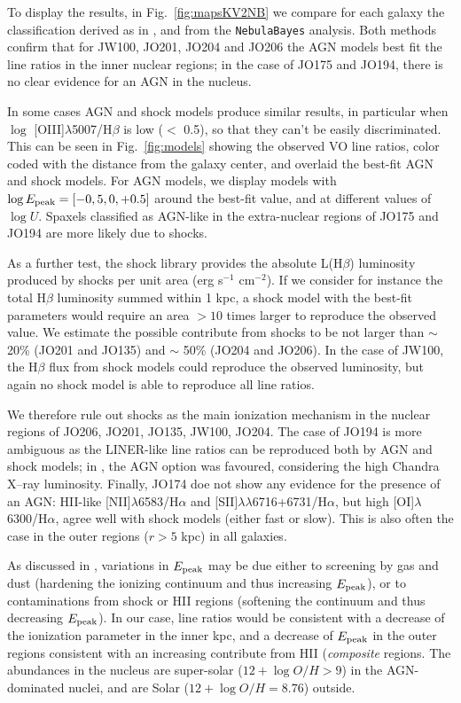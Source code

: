\documentclass[fleqn,usenatbib]{mnras}
\begin{document}
To display the results, in Fig.~\ref{fig:mapsKV2NB} we compare for each galaxy the classification derived as in \citet{2017ApJ...844...48P}, and from the \texttt{NebulaBayes} analysis. Both methods confirm that for JW100, JO201, JO204 and JO206 the AGN models best fit the line ratios in the inner nuclear regions; in the case of JO175 and JO194, there is no clear evidence for an AGN in the nucleus. 

In some cases AGN and shock models produce similar results, in particular when $\log$ [OIII]$\lambda$5007/H$\beta$  is low ($<$ 0.5), so that they can't be easily discriminated. This can be seen in Fig.~\ref{fig:models} showing the observed VO line ratios, color coded with the distance from the galaxy center, and  overlaid the
best-fit AGN and shock models. For AGN models, we display models with $\log E_{\rm peak} =[-0,5,0,+0.5]$ around the best-fit value, and at different values of $\log U$. 
Spaxels classified as AGN-like in the extra-nuclear regions of  JO175 and JO194 are more likely due to shocks. 

As a further test, the \citet{2008ApJS..178...20A} shock library  provides the   absolute L(H$\beta$) luminosity  produced by shocks per unit area (erg s$^{-1}$ cm$^{-2}$). If we consider for instance the total H$\beta$ luminosity summed within 1 kpc, a shock model with the best-fit parameters would require an area  $>10$ times larger to reproduce the observed value. We estimate the possible contribute from shocks to be not larger than $\sim$ 20\% (JO201 and JO135) and $\sim$ 50\% (JO204 and JO206). In the case of JW100, the H$\beta$ flux from shock models could reproduce the observed luminosity, but again no shock model is able to reproduce all line ratios.


We therefore rule out shocks as the main ionization mechanism in the nuclear regions of JO206, JO201, JO135, JW100, JO204. The case of JO194 is more ambiguous as the LINER-like line ratios can be reproduced both by AGN and shock models; in \citet{2017Natur.548..304P}, the AGN option was favoured, considering the high Chandra X--ray luminosity. 
Finally, JO174 doe not show any evidence for the presence of an AGN:  HII-like [NII]$\lambda$6583/H$\alpha$ and [SII]$\lambda\lambda$6716+6731/H$\alpha$, but high [OI]$\lambda$6300/H$\alpha$, agree well with shock models (either fast or slow).  This is also often the case in the outer regions ($r > 5$ kpc) in all galaxies. 


As discussed in \citet{2018ApJ...856...89T}, variations in $E_{\rm peak}$ may be due either to screening by gas and dust (hardening the ionizing continuum and thus increasing $E_{\rm peak}$), or to contaminations from shock or HII regions (softening the continuum and thus decreasing $E_{\rm peak}$). In our case, line ratios would be consistent with a decrease of the ionization parameter  in the inner kpc, and a decrease  of  $E_{\rm peak}$ in the outer regions consistent with an increasing contribute from HII ({\em composite} regions. The abundances in the nucleus are super-solar ($12+\log O/H > 9$) in the  AGN-dominated 
nuclei, and are Solar  ($12+\log O/H = 8.76$) outside.
\end{document}
